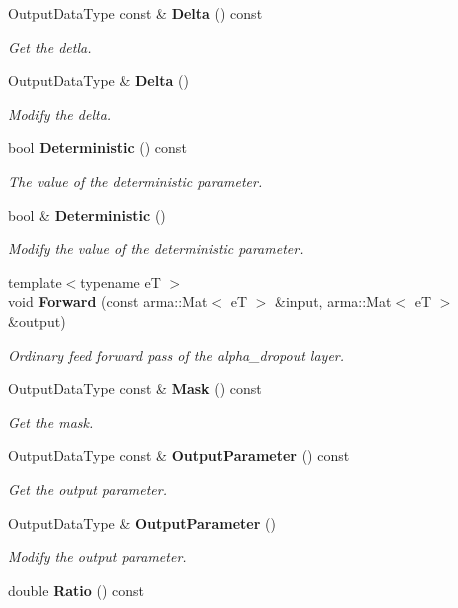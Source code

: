 \begin{DoxyCompactItemize}
Output\+Data\+Type const  \& \textbf{ Delta} () const
\begin{DoxyCompactList}\small\item\em Get the detla. \end{DoxyCompactList}\item 
Output\+Data\+Type \& \textbf{ Delta} ()
\begin{DoxyCompactList}\small\item\em Modify the delta. \end{DoxyCompactList}\item 
bool \textbf{ Deterministic} () const
\begin{DoxyCompactList}\small\item\em The value of the deterministic parameter. \end{DoxyCompactList}\item 
bool \& \textbf{ Deterministic} ()
\begin{DoxyCompactList}\small\item\em Modify the value of the deterministic parameter. \end{DoxyCompactList}\item 
{\footnotesize template$<$typename eT $>$ }\\void \textbf{ Forward} (const arma\+::\+Mat$<$ eT $>$ \&input, arma\+::\+Mat$<$ eT $>$ \&output)
\begin{DoxyCompactList}\small\item\em Ordinary feed forward pass of the alpha\+\_\+dropout layer. \end{DoxyCompactList}\item 
Output\+Data\+Type const  \& \textbf{ Mask} () const
\begin{DoxyCompactList}\small\item\em Get the mask. \end{DoxyCompactList}\item 
Output\+Data\+Type const  \& \textbf{ Output\+Parameter} () const
\begin{DoxyCompactList}\small\item\em Get the output parameter. \end{DoxyCompactList}\item 
Output\+Data\+Type \& \textbf{ Output\+Parameter} ()
\begin{DoxyCompactList}\small\item\em Modify the output parameter. \end{DoxyCompactList}\item 
double \textbf{ Ratio} () const

\end{DoxyCompactItemize}
